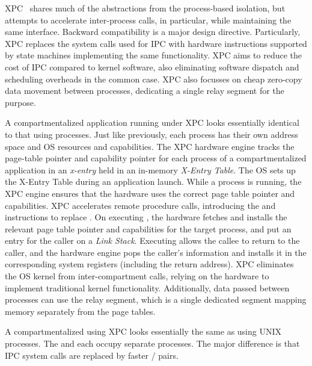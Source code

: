 XPC~\cite{DuHXZC19XPC} shares much of the abstractions from the process-based
isolation, but attempts to accelerate inter-process calls, in particular, 
while maintaining the same interface.
Backward compatibility is a major design directive.
Particularly, XPC replaces the system calls used for IPC with hardware 
instructions supported by state machines implementing the same functionality.
XPC aims to reduce the cost of IPC compared to kernel software, 
also eliminating software dispatch and scheduling overheads in the common case.
XPC also focusses on cheap zero-copy data movement between processes,
dedicating a single relay segment for the purpose.

A compartmentalized application running under XPC looks essentially identical
to that using processes.
Just like previously, each process has their own address space and OS 
resources and capabilities.
The XPC hardware engine tracks the page-table pointer and capability pointer
for each process of a compartmentalized application in an \emph{x-entry} held in
an in-memory \emph{X-Entry Table}.
The OS sets up the X-Entry Table during an application launch.
While a process is running, the XPC engine ensures that the hardware uses the
correct page table pointer and capabilities.
XPC accelerates remote procedure calls, introducing the  and
 instructions to replace .
On executing , the hardware fetches and installs the relevant 
page table pointer and capabilities for the target process, 
and put an entry for the caller on a \emph{Link Stack}.
Executing  allows the callee to return to the caller, and the
hardware engine pops the caller's information and installs it in the
corresponding system registers (including the return address). 
XPC eliminates the OS kernel from inter-compartment calls, relying on the 
hardware to implement traditional kernel functionality.
Additionally, data passed between processes can use the relay segment, which
is a single dedicated segment mapping memory separately from the page tables.

A \browser compartmentalized using XPC looks essentially the same as
using UNIX processes. 
The \renderer and each \sandbox occupy separate processes.
The major difference is that IPC system calls are replaced by faster
/ pairs.

